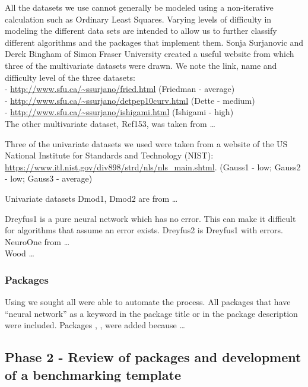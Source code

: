 All the datasets we use cannot generally be modeled using a
non-iterative calculation such as Ordinary Least Squares. Varying levels
of difficulty in modeling the different data sets are intended to allow
us to further classify different algorithms and the packages that
implement them. Sonja Surjanovic and Derek Bingham of Simon Fraser
University created a useful website from which three of the multivariate
datasets were drawn. We note the link, name and difficulty level of the
three datasets:\\
- \url{http://www.sfu.ca/~ssurjano/fried.html} (Friedman - average)\\
- \url{http://www.sfu.ca/~ssurjano/detpep10curv.html} (Dette - medium)\\
- \url{http://www.sfu.ca/~ssurjano/ishigami.html} (Ishigami - high)\\
The other multivariate dataset, Ref153, was taken from \ldots{}

Three of the univariate datasets we used were taken from a website of
the US National Institute for Standards and Technology (NIST):
\url{https://www.itl.nist.gov/div898/strd/nls/nls_main.shtml}. (Gauss1 -
low; Gauss2 - low; Gauss3 - average)

Univariate datasets Dmod1, Dmod2 are from \ldots{}

Dreyfus1 is a pure neural network which has no error. This can make it
difficult for algorithms that assume an error exists. Dreyfus2 is
Dreyfus1 with errors. NeuroOne from \ldots{}\\
Wood \ldots{}

\hypertarget{packages}{%
\subsubsection{Packages}\label{packages}}

Using  \citep{R-RWsearch} we sought all were able to
automate the process. All packages that have ``neural network'' as a
keyword in the package title or in the package description were
included. Packages , ,  were added
because \ldots{}

\hypertarget{phase-2---review-of-packages-and-development-of-a-benchmarking-template}{%
\subsection{Phase 2 - Review of packages and development of a
benchmarking
template}\label{phase-2---review-of-packages-and-development-of-a-benchmarking-template}}

